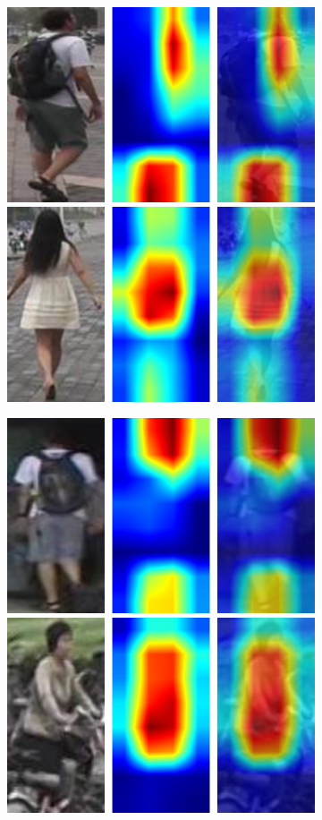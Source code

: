 \begin{figure}
    \centering
    
    \begin{subfigure}[b]{0.98\textwidth}
        \centering
        \includegraphics[width=0.45\columnwidth]{5_unlearn/figs/scrub/0006_mlfn_rem1.jpg}
        \hspace{15pt}
        \includegraphics[width=0.45\columnwidth]{5_unlearn/figs/scrub/0001_mlfn_ret1.jpg}
    \end{subfigure}
    
    \vspace{5 pt}
    
    \begin{subfigure}[b]{0.98\textwidth}
        \centering
        \includegraphics[width=0.45\columnwidth]{5_unlearn/figs/scrub/0006_mlfn_rem2.jpg}
        \hspace{15pt}
        \includegraphics[width=0.45\columnwidth]{5_unlearn/figs/scrub/0029_mlfn_ret2.jpg}
    \end{subfigure}
    

\end{figure}
